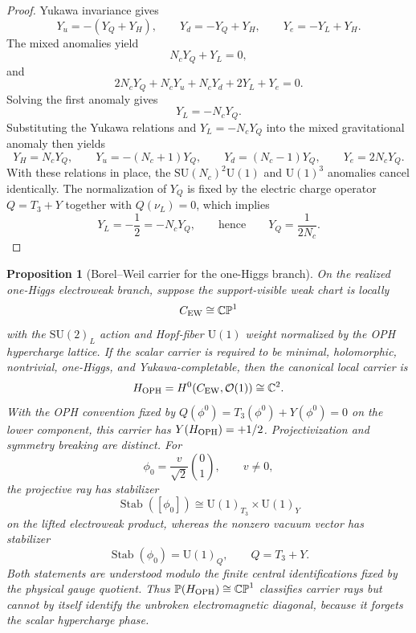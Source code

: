 \documentclass[11pt]{article}
\newtheorem{proposition}[theorem]{Proposition}
\newcommand{\SU}{\mathrm{SU}}
\newcommand{\U}{\mathrm{U}}
\begin{document}
\begin{proof}
Yukawa invariance gives
\[
Y_u=-(Y_Q+Y_H),\qquad
Y_d=-Y_Q+Y_H,\qquad
Y_e=-Y_L+Y_H.
\]
The mixed anomalies yield
\[
N_cY_Q+Y_L=0,
\]
and
\[
2N_cY_Q+N_cY_u+N_cY_d+2Y_L+Y_e=0.
\]
Solving the first anomaly gives
\[
Y_L=-N_cY_Q.
\]
Substituting the Yukawa relations and $Y_L=-N_cY_Q$ into the mixed gravitational anomaly then yields
\[
Y_H=N_cY_Q,\qquad
Y_u=-(N_c+1)Y_Q,\qquad
Y_d=(N_c-1)Y_Q,\qquad
Y_e=2N_cY_Q.
\]
With these relations in place, the $\SU(N_c)^2\U(1)$ and $\U(1)^3$ anomalies cancel identically. The normalization of $Y_Q$ is fixed by the electric charge operator $Q=T_3+Y$ together with $Q(\nu_L)=0$, which implies
\[
Y_L=-\frac12=-N_cY_Q,
\qquad\text{hence}\qquad
Y_Q=\frac{1}{2N_c}.
\]
\end{proof}

\begin{proposition}[Borel--Weil carrier for the one-Higgs branch]\label{prop:bw-higgs-carrier}
On the realized one-Higgs electroweak branch, suppose the support-visible weak chart is locally
\[
C_{\rm EW}\cong\mathbb{CP}^1
\]
with the \(\SU(2)_L\) action and Hopf-fiber \(\U(1)\) weight normalized by the OPH hypercharge lattice. If the scalar carrier is required to be minimal, holomorphic, nontrivial, one-Higgs, and Yukawa-completable, then the canonical local carrier is
\[
H_{\rm OPH}=H^0(C_{\rm EW},\mathcal O(1))\cong\mathbb C^2.
\]
With the OPH convention fixed by \(Q(\phi^0)=T_3(\phi^0)+Y(\phi^0)=0\) on the lower component, this carrier has \(Y(H_{\rm OPH})=+1/2\). Projectivization and symmetry breaking are distinct. For
\[
\phi_0=\frac{v}{\sqrt2}\binom{0}{1},\qquad v\ne0,
\]
the projective ray has stabilizer
\[
\operatorname{Stab}([\phi_0])
\cong \U(1)_{T_3}\times\U(1)_Y
\]
on the lifted electroweak product, whereas the nonzero vacuum vector has stabilizer
\[
\operatorname{Stab}(\phi_0)=\U(1)_Q,
\qquad Q=T_3+Y.
\]
Both statements are understood modulo the finite central identifications fixed by the physical gauge quotient. Thus \(\mathbb P(H_{\rm OPH})\cong\mathbb{CP}^1\) classifies carrier rays but cannot by itself identify the unbroken electromagnetic diagonal, because it forgets the scalar hypercharge phase.
\end{proposition}
\end{document}
